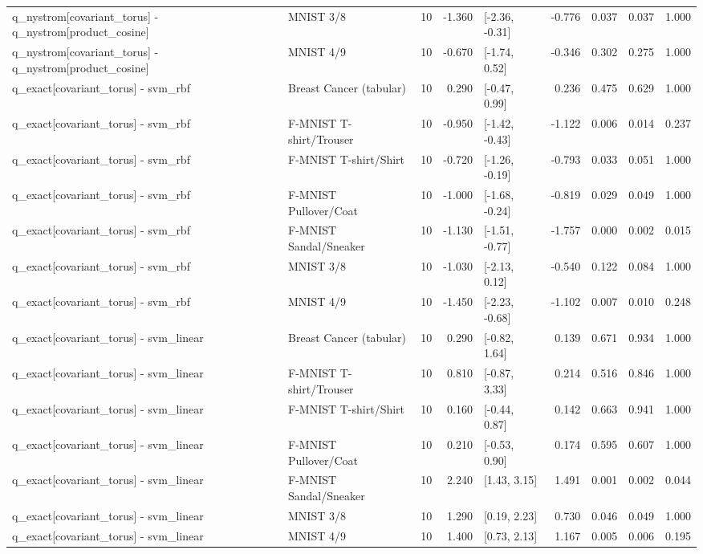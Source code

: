 \begin{table}
\begin{tabular}{llrrlrrrr}
q\_nystrom[covariant\_torus] - q\_nystrom[product\_cosine] & MNIST 3/8 & 10 & -1.360 & [-2.36, -0.31] & -0.776 & 0.037 & 0.037 & 1.000 \\
q\_nystrom[covariant\_torus] - q\_nystrom[product\_cosine] & MNIST 4/9 & 10 & -0.670 & [-1.74, 0.52] & -0.346 & 0.302 & 0.275 & 1.000 \\
q\_exact[covariant\_torus] - svm\_rbf & Breast Cancer (tabular) & 10 & 0.290 & [-0.47, 0.99] & 0.236 & 0.475 & 0.629 & 1.000 \\
q\_exact[covariant\_torus] - svm\_rbf & F-MNIST T-shirt/Trouser & 10 & -0.950 & [-1.42, -0.43] & -1.122 & 0.006 & 0.014 & 0.237 \\
q\_exact[covariant\_torus] - svm\_rbf & F-MNIST T-shirt/Shirt & 10 & -0.720 & [-1.26, -0.19] & -0.793 & 0.033 & 0.051 & 1.000 \\
q\_exact[covariant\_torus] - svm\_rbf & F-MNIST Pullover/Coat & 10 & -1.000 & [-1.68, -0.24] & -0.819 & 0.029 & 0.049 & 1.000 \\
q\_exact[covariant\_torus] - svm\_rbf & F-MNIST Sandal/Sneaker & 10 & -1.130 & [-1.51, -0.77] & -1.757 & 0.000 & 0.002 & 0.015 \\
q\_exact[covariant\_torus] - svm\_rbf & MNIST 3/8 & 10 & -1.030 & [-2.13, 0.12] & -0.540 & 0.122 & 0.084 & 1.000 \\
q\_exact[covariant\_torus] - svm\_rbf & MNIST 4/9 & 10 & -1.450 & [-2.23, -0.68] & -1.102 & 0.007 & 0.010 & 0.248 \\
q\_exact[covariant\_torus] - svm\_linear & Breast Cancer (tabular) & 10 & 0.290 & [-0.82, 1.64] & 0.139 & 0.671 & 0.934 & 1.000 \\
q\_exact[covariant\_torus] - svm\_linear & F-MNIST T-shirt/Trouser & 10 & 0.810 & [-0.87, 3.33] & 0.214 & 0.516 & 0.846 & 1.000 \\
q\_exact[covariant\_torus] - svm\_linear & F-MNIST T-shirt/Shirt & 10 & 0.160 & [-0.44, 0.87] & 0.142 & 0.663 & 0.941 & 1.000 \\
q\_exact[covariant\_torus] - svm\_linear & F-MNIST Pullover/Coat & 10 & 0.210 & [-0.53, 0.90] & 0.174 & 0.595 & 0.607 & 1.000 \\
q\_exact[covariant\_torus] - svm\_linear & F-MNIST Sandal/Sneaker & 10 & 2.240 & [1.43, 3.15] & 1.491 & 0.001 & 0.002 & 0.044 \\
q\_exact[covariant\_torus] - svm\_linear & MNIST 3/8 & 10 & 1.290 & [0.19, 2.23] & 0.730 & 0.046 & 0.049 & 1.000 \\
q\_exact[covariant\_torus] - svm\_linear & MNIST 4/9 & 10 & 1.400 & [0.73, 2.13] & 1.167 & 0.005 & 0.006 & 0.195 \\

\end{tabular}
\end{table}
